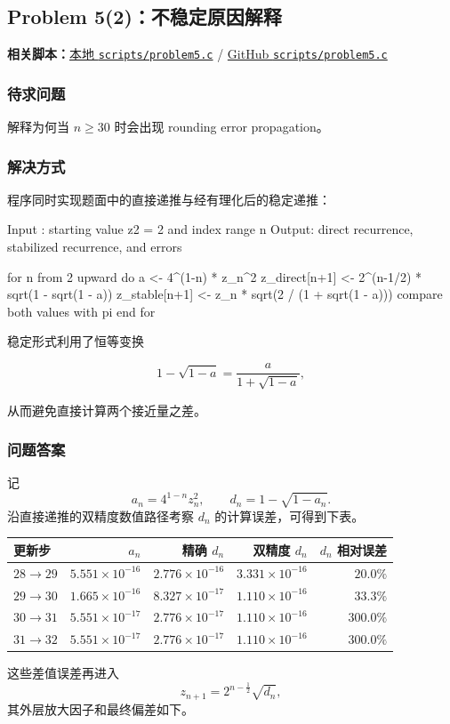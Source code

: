\documentclass[12pt,a4paper,fontset=none]{ctexart}
\newcommand{\problem}[1]{\subsection{#1}}
\newcommand{\blocktitle}[1]{\subsubsection{#1}}
\newcommand{\fileinline}[1]{{\urlstyle{same}\nolinkurl{#1}}}
\newcommand{\scriptpath}[1]{\fileinline{#1}}
\newcommand{\githubscriptsbase}{https://github.com/Void0312Aurora/computational-physics-homework-2026/blob/main/02/scripts}
\newcommand{\scriptlink}[1]{\noindent\textbf{相关脚本：}\href{../../../scripts/#1}{本地 \scriptpath{scripts/#1}} / \href{\githubscriptsbase/#1}{GitHub \scriptpath{scripts/#1}}\par\medskip}
\newcounter{none}
\begin{document}
\problem{Problem 5(2)：不稳定原因解释}

\scriptlink{problem5.c}

\blocktitle{待求问题}

解释为何当 \(n\ge 30\) 时会出现 rounding error propagation。

\blocktitle{解决方式}

程序同时实现题面中的直接递推与经有理化后的稳定递推：

\begin{CodeBlock}
Input : starting value z2 = 2 and index range n
Output: direct recurrence, stabilized recurrence, and errors

for n from 2 upward do
    a <- 4^(1-n) * z_n^2
    z_direct[n+1] <- 2^(n-1/2) * sqrt(1 - sqrt(1 - a))
    z_stable[n+1] <- z_n * sqrt(2 / (1 + sqrt(1 - a)))
    compare both values with pi
end for
\end{CodeBlock}

稳定形式利用了恒等变换

\[
1-\sqrt{1-a}=\frac{a}{1+\sqrt{1-a}},
\]

从而避免直接计算两个接近量之差。

\blocktitle{问题答案}

记
\[
a_n=4^{1-n}z_n^2,\qquad d_n=1-\sqrt{1-a_n}.
\]
沿直接递推的双精度数值路径考察 \(d_n\) 的计算误差，可得到下表。

{\def\LTcaptype{none} %
\begin{longtable}[]{@{}lrrrr@{}}
\toprule\noalign{}
更新步 & \(a_n\) & 精确 \(d_n\) & 双精度 \(d_n\) & \(d_n\) 相对误差 \\
\midrule\noalign{}
\endhead
\bottomrule\noalign{}
\endlastfoot
\(28\to29\) & \(5.551\times10^{-16}\) & \(2.776\times10^{-16}\) & \(3.331\times10^{-16}\) & \(20.0\%\) \\
\(29\to30\) & \(1.665\times10^{-16}\) & \(8.327\times10^{-17}\) & \(1.110\times10^{-16}\) & \(33.3\%\) \\
\(30\to31\) & \(5.551\times10^{-17}\) & \(2.776\times10^{-17}\) & \(1.110\times10^{-16}\) & \(300.0\%\) \\
\(31\to32\) & \(5.551\times10^{-17}\) & \(2.776\times10^{-17}\) & \(1.110\times10^{-16}\) & \(300.0\%\) \\
\end{longtable}
}

这些差值误差再进入
\[
z_{n+1}=2^{n-\frac12}\sqrt{d_n},
\]
其外层放大因子和最终偏差如下。
\end{document}

